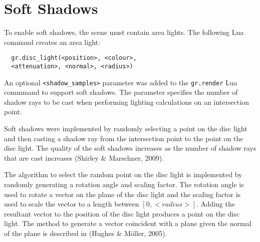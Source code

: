 \section{Soft Shadows}

To enable soft shadows, the scene must contain area lights. The following Lua 
command creates an area light:
\begin{lstlisting}
  gr.disc_light(<position>, <colour>, 
  <attenuation>, <normal>, <radius>)
\end{lstlisting}
  
An optional \verb|<shadow_samples>| parameter was added to the \newline
\verb|gr.render| Lua commmand to support soft shadows. The parameter specifies 
the number of shadow rays to be cast when performing lighting calculations on 
an intersection point.

Soft shadows were implemented by randomly selecting a point on the disc light
and then casting a shadow ray from the intersection point to the point on the
disc light. The quality of the soft shadows increases as the number of shadow
rays that are cast increases (Shirley \& Marschner, 2009).

The algorithm to select the random point on the disc light is implemented by
randomly generating a rotation angle and scaling factor. The rotation angle is
used to rotate a vector on the plane of the disc light and the scaling factor is 
used to scale the vector to a length between $[0, <radius>]$. Adding the 
resultant vector to the position of the disc light produces a point on the disc
light. The method to generate a vector coincident with a plane given the normal
of the plane is described in (Hughes \& M{\"o}ller, 2005).


